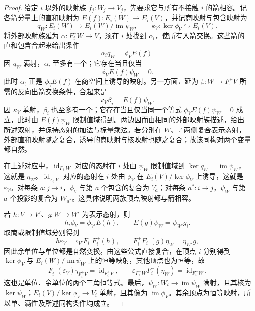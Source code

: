 \begin{proof}
	给定 \(i\) 以外的映射族 \(f_j:W_j\to V_j\)，先要求它与所有不接触 \(i\) 的箭相容。记各箭分量上的直和映射为 \(E(f):E_i(W)\to E_i(V)\)，并记商映射与包含映射为
	\[
		q_W:E_i(W)\longrightarrow E_i(W)/\operatorname{im}\psi_W, \qquad \kappa_V:\ker\phi_V\hookrightarrow E_i(V).
	\]
	将外部映射族延为 \(\alpha:F_i^-W\to V\)，须在 \(i\) 处找到 \(\alpha_i\)，使所有入箭交换。这些箭的直和包含合起来给出条件
	\[
		\alpha_iq_W=\phi_VE(f).
	\]
	因 \(q_W\) 满射，\(\alpha_i\) 至多有一个；它存在当且仅当
	\[
		\phi_VE(f)\psi_W=0.
	\]
	此时 \(\alpha_i\) 正是 \(\phi_VE(f)\) 在商空间上诱导的映射。另一方面，延为 \(\beta:W\to F_i^+V\) 所需的反向出箭交换条件，合起来是
	\[
		\kappa_V\beta_i=E(f)\psi_W.
	\]
	因 \(\kappa_V\) 单射，\(\beta_i\) 也至多有一个；它存在当且仅当同一个等式 \(\phi_VE(f)\psi_W=0\) 成立，此时由 \(E(f)\psi_W\) 限制值域得到。两边因而由相同的外部映射族描述，给出所述双射，并保持态射的加法与标量乘法。若分别在 \(W\)、\(V\) 两侧复合表示态射，外部直和映射随之复合，诱导的商映射与核映射也随之复合；故该同构对两个变量都自然。

	在上述对应中，\(\operatorname{id}_{F_i^-W}\) 对应的态射在 \(i\) 处由 \(\psi_W\) 限制值域到 \(\ker q_W=\operatorname{im}\psi_W\)，这就是 \(\eta_W\)。\(\operatorname{id}_{F_i^+V}\) 对应的态射在 \(i\) 处由 \(\phi_V\) 在 \(E_i(V)/\ker\phi_V\) 上诱导，这就是 \(\varepsilon_V\)。对每条 \(a:j\to i\)，\(\phi_V\) 与第 \(a\) 个包含的复合为 \(V_a\)；对每条 \(a^*:i\to j\)，\(\psi_W\) 与第 \(a\) 个投影的复合为 \(W_{a^*}\)。这具体说明两族顶点映射都与箭相容。

	若 \(h:V\to V'\)、\(g:W\to W'\) 为表示态射，则
	\[
		h_i\phi_V=\phi_{V'}E(h),\qquad E(g)\psi_W=\psi_{W'}g_i.
	\]
	取商或限制值域分别得到
	\[
		h\varepsilon_V=\varepsilon_{V'}F_i^-F_i^+(h),\qquad F_i^+F_i^-(g)\eta_W=\eta_{W'}g,
	\]
	因此余单位与单位都是自然变换。由这些公式直接复合，在顶点 \(i\) 分别得到 \(\ker\phi_V\) 与 \(E_i(W)/\operatorname{im}\psi_W\) 上的恒等映射，其他顶点也为恒等，故
	\[
		F_i^+(\varepsilon_V)\eta_{F_i^+V}=\operatorname{id}_{F_i^+V}, \qquad \varepsilon_{F_i^-W}F_i^-(\eta_W)=\operatorname{id}_{F_i^-W}.
	\]
	这也是单位、余单位的两个三角恒等式。最后，\(\psi_W:W_i\to\operatorname{im}\psi_W\) 满射，且其核为 \(\ker\psi_W\)；\(E_i(V)/\ker\phi_V\to V_i\) 单射，且其像为 \(\operatorname{im}\phi_V\)。其余顶点为恒等映射，所以单、满性及所述同构条件均成立。
\end{proof}

